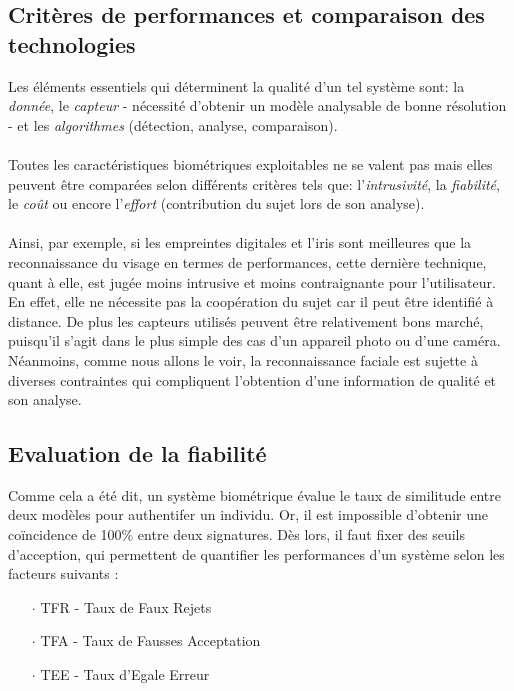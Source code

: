\subsection{Critères de performances et comparaison des technologies}
Les éléments essentiels qui déterminent la qualité d'un tel système sont: la \textit{donnée}, le \textit{capteur} - nécessité d'obtenir un modèle analysable de bonne résolution - et les \textit{algorithmes} (détection, analyse, comparaison).
\paragraph{}
Toutes les caractéristiques biométriques exploitables ne se valent pas mais elles peuvent être comparées selon différents critères tels que: l'\textit{intrusivité}, la \textit{fiabilité}, le \textit{coût} ou encore l'\textit{effort} (contribution du sujet lors de son analyse).
\paragraph{}
Ainsi, par exemple, si les empreintes digitales et l'iris sont meilleures que la reconnaissance du visage en termes de performances, cette dernière technique, quant à elle, est jugée moins intrusive et moins contraignante pour l'utilisateur. En effet, elle ne nécessite pas la coopération du sujet car il peut être identifié à distance. De plus les capteurs utilisés peuvent être relativement bons marché, puisqu'il s'agit dans le plus simple des cas d'un appareil photo ou d'une caméra.
\\Néanmoins, comme nous allons le voir, la reconnaissance faciale est sujette à diverses contraintes qui compliquent l'obtention d'une information de qualité et son analyse.

\subsection{Evaluation de la fiabilité}
Comme cela a été dit, un système biométrique évalue le taux de similitude entre deux modèles pour authentifer un individu. Or, il est impossible d'obtenir une coïncidence de 100\% entre deux signatures. Dès lors, il faut fixer des seuils d'acception, qui permettent de quantifier les performances d'un système selon les facteurs suivants \cite{Xmisc_2}:
\begin{itemize}
\item[$\cdot$]\textsc{TFR} - Taux de Faux Rejets 
\item[$\cdot$]\textsc{TFA} - Taux de Fausses Acceptation
\item[$\cdot$]\textsc{TEE} - Taux d'Egale Erreur
\end{itemize}